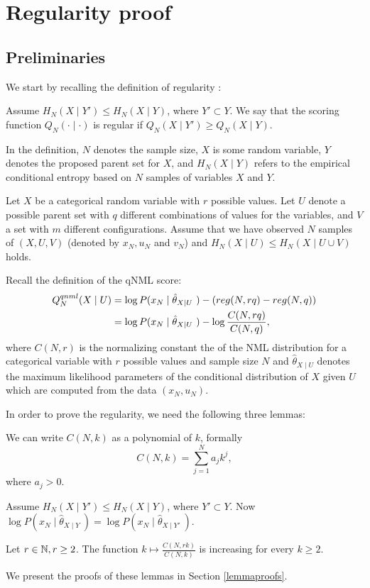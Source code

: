 \section{Regularity proof}

\subsection{Preliminaries}
We start by recalling the definition of regularity \citep{Suzuki2017}:

\begin{definition}
Assume $H_N(X \mid Y') \leq H_N(X \mid Y)$, where $Y' \subset Y.$ We say that the scoring function $Q_N(\cdot \mid \cdot)$ is regular if $Q_N(X \mid Y') \geq Q_N(X \mid Y)$.
\end{definition}
In the definition, $N$ denotes the sample size, $X$ is some random variable, $Y$ denotes the proposed parent set for $X$, and $H_N(X \mid Y)$ refers to the empirical conditional entropy based on $N$ samples of variables $X$ and $Y$.

Let $X$ be a categorical random variable with $r$ possible values. Let $U$ denote a possible parent set with $q$ different combinations of values for the variables, and $V$ a set with $m$ different configurations. Assume that we have observed $N$ samples of $(X,U,V)$ (denoted by $x_N,u_N$ and $v_N$) and $H_N(X \mid U) \leq H_N(X \mid U \cup V)$ holds.

Recall the definition of the qNML score:
\begin{align*}
Q^{qnml}_N(X\mid U) &= \log P(x_N \mid \hat{\theta}_{X\mid U} \ ) - \left( reg(N,rq) - reg(N,q) \right) \\
&= \log P(x_N \mid \hat{\theta}_{X\mid U} \ ) - \log \frac{C(N,rq)}{C(N,q)},
\end{align*}where $C(N,r)$ is the normalizing constant the of the NML distribution for a categorical variable with $r$ possible values and sample size $N$ and $ \hat{\theta}_{X\mid U}$ denotes the maximum likelihood parameters of the conditional distribution of $X$ given $U$ which are computed from the data $(x_N,u_N)$. 


In order to prove the regularity, we need the following three lemmas:
\begin{lemma}\label{Cpolynom} We can write $C(N,k)$ as a polynomial of $k$, formally
$$
C(N,k) = \sum_{j=1}^N a_j k^j,
$$where $a_j > 0$. 
\end{lemma}
\begin{lemma}\label{MLterms}
Assume $H_N(X \mid Y') \leq H_N(X \mid Y)$, where $Y' \subset Y$. Now $\log P(x_N \mid \hat{\theta}_{X\mid Y} \ ) = \log P(x_N \mid \hat{\theta}_{X\mid Y'} \ )$.
\end{lemma}
\begin{lemma}\label{increasing}
Let $r \in \mathbb{N}, r \geq 2$.  The function $k \mapsto \frac{C(N,rk)}{C(N,k)}$ is increasing for every $k \geq 2$.
\end{lemma}
\noindent We present the proofs of these lemmas in Section \ref{lemmaproofs}.  

